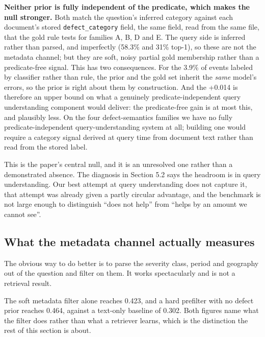 \documentclass[acmsmall]{acmart}
\begin{document}
\textbf{Neither prior is fully independent of the predicate, which makes the null stronger.} Both match the question's inferred category against each document's stored \texttt{defect\_category} field, the same field, read from the same file, that the gold rule tests for families A, B, D and E. The query side is inferred rather than parsed, and imperfectly (58.3\% and 31\% top-1), so these are not the metadata channel; but they are soft, noisy partial gold membership rather than a predicate-free signal. This has two consequences. For the 3.9\% of events labeled by classifier rather than rule, the prior and the gold set inherit the \textit{same} model's errors, so the prior is right about them by construction. And the +0.014 is therefore an upper bound on what a genuinely predicate-independent query understanding component would deliver: the predicate-free gain is at most this, and plausibly less. On the four defect-semantics families we have no fully predicate-independent query-understanding system at all; building one would require a category signal derived at query time from document text rather than read from the stored label.

This is the paper's central null, and it is an unresolved one rather than a demonstrated absence. The diagnosis in Section 5.2 says the headroom is in query understanding. Our best attempt at query understanding does not capture it, that attempt was already given a partly circular advantage, and the benchmark is not large enough to distinguish ``does not help'' from ``helps by an amount we cannot see''.


\subsection{What the metadata channel actually measures}
The obvious way to do better is to parse the severity class, period and geography out of the question and filter on them. It works spectacularly and is not a retrieval result.

The soft metadata filter alone reaches 0.423, and a hard prefilter with no defect prior reaches 0.464, against a text-only baseline of 0.302. Both figures name what the filter does rather than what a retriever learns, which is the distinction the rest of this section is about.
\end{document}
